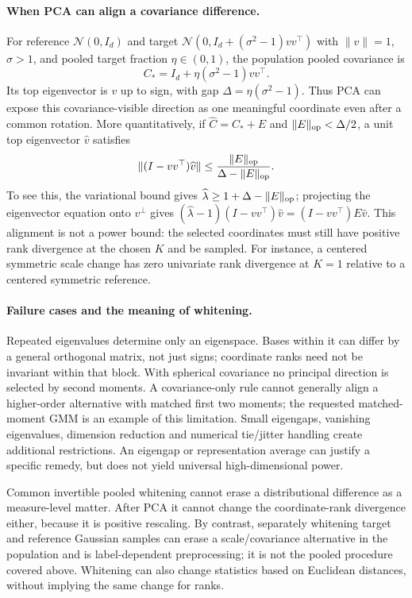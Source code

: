 {\paragraph{When PCA can align a covariance difference.}
For reference $\mathcal N(0,I_d)$ and target $\mathcal N(0,I_d+(\sigma^2-1)vv^\top)$ with $\|v\|=1$, $\sigma>1$, and pooled target fraction $\eta\in(0,1)$, the population pooled covariance is
\[
C_*=I_d+\eta(\sigma^2-1)vv^\top.
\]
Its top eigenvector is $v$ up to sign, with gap $\Delta=\eta(\sigma^2-1)$. Thus PCA can expose this covariance-visible direction as one meaningful coordinate even after a common rotation. More quantitatively, if $\widehat C=C_*+E$ and $\|E\|_{\rm op}<\Delta/2$, a unit top eigenvector $\widehat v$ satisfies
\[
\|(I-vv^\top)\widehat v\|\le
\frac{\|E\|_{\rm op}}{\Delta-\|E\|_{\rm op}}.
\]
To see this, the variational bound gives $\widehat\lambda\ge1+\Delta-\|E\|_{\rm op}$; projecting the eigenvector equation onto $v^\perp$ gives $(\widehat\lambda-1)(I-vv^\top)\widehat v=(I-vv^\top)E\widehat v$. This alignment is not a power bound: the selected coordinates must still have positive rank divergence at the chosen $K$ and be sampled. For instance, a centered symmetric scale change has zero univariate rank divergence at $K=1$ relative to a centered symmetric reference.

\paragraph{Failure cases and the meaning of whitening.}
Repeated eigenvalues determine only an eigenspace. Bases within it can differ by a general orthogonal matrix, not just signs; coordinate ranks need not be invariant within that block. With spherical covariance no principal direction is selected by second moments. A covariance-only rule cannot generally align a higher-order alternative with matched first two moments; the requested matched-moment GMM is an example of this limitation. Small eigengaps, vanishing eigenvalues, dimension reduction and numerical tie/jitter handling create additional restrictions. An eigengap or representation average can justify a specific remedy, but does not yield universal high-dimensional power.

Common invertible pooled whitening cannot erase a distributional difference as a measure-level matter. After PCA it cannot change the coordinate-rank divergence either, because it is positive rescaling. By contrast, separately whitening target and reference Gaussian samples can erase a scale/covariance alternative in the population and is label-dependent preprocessing; it is not the pooled procedure covered above. Whitening can also change statistics based on Euclidean distances, without implying the same change for ranks.

}
